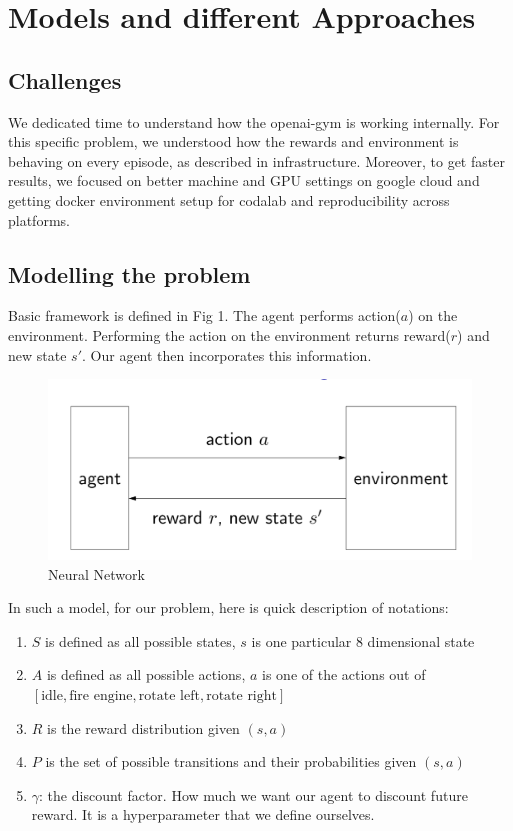 \section{Models and different Approaches}
\subsection{Challenges}

We dedicated time to understand how the openai-gym is working internally. For this specific problem, we understood how the rewards and environment is behaving on every episode, as described in infrastructure. Moreover, to get faster results, we focused on better machine and GPU settings on google cloud and getting docker environment setup for codalab and reproducibility across platforms.

\subsection{Modelling the problem}

Basic framework is defined in Fig 1. The agent performs action($a$) on the environment. Performing the action on the environment returns reward($r$) and new state $s'$. Our agent then incorporates this information.

\begin{figure}[!ht]
\centering
\includegraphics[scale=0.75,width=0.75\columnwidth]{reinforcement_framework.png}%
\caption{ Neural Network}%
\label{fig:Visualization}%
\end{figure}

In such a model, for our problem, here is quick description of notations:
\begin{enumerate}
\item $S$ is defined as all possible states, $s$ is one particular 8 dimensional state
\item $A$ is defined as all possible actions, $a$ is one of the actions out of $[\text{idle}, \text{fire engine}, \text{rotate left}, \text{rotate right}]$
\item $R$ is the reward distribution given $(s, a)$
\item $P$ is the set of possible transitions and their probabilities given $(s, a)$
\item $\gamma$: the discount factor. How much we want our agent to discount future reward. It is a hyperparameter that we define ourselves.
\end{enumerate}

